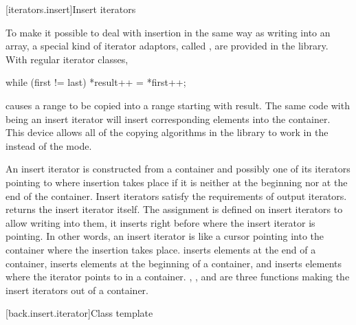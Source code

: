 [iterators.insert]{Insert iterators}

\pnum
To make it possible to deal with insertion in the same way as writing into an array, a special kind of iterator
adaptors, called
,
are provided in the library.
With regular iterator classes,

\begin{codeblock}
while (first != last) *result++ = *first++;
\end{codeblock}

causes a range 
to be copied into a range starting with result.
The same code with
being an insert iterator will insert corresponding elements into the container.
This device allows all of the
copying algorithms in the library to work in the
instead of the  mode.

\pnum
An insert iterator is constructed from a container and possibly one of its iterators pointing to where
insertion takes place if it is neither at the beginning nor at the end of the container.
Insert iterators satisfy the requirements of output iterators.
returns the insert iterator itself.
The assignment
is defined on insert iterators to allow writing into them, it inserts
right before where the insert iterator is pointing.
In other words, an insert iterator is like a cursor pointing into the
container where the insertion takes place.
inserts elements at the end of a container,
inserts elements at the beginning of a container, and
inserts elements where the iterator points to in a container.
,
,
and
are three
functions making the insert iterators out of a container.

[back.insert.iterator]{Class template }

